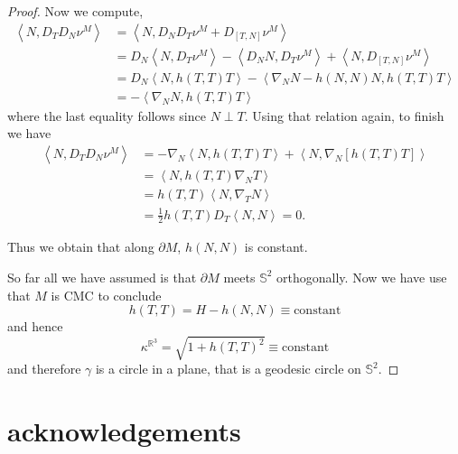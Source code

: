 \documentclass[10pt]{amsart}
\newcommand{\IP}[2]{\left< #1 , #2 \right>}
\newcommand{\R}{\ensuremath{\mathbb{R}}}
\renewcommand{\S}{\ensuremath{\mathbb{S}}}
\theoremstyle{remark}
\begin{document}
\begin{proof}
Now we compute,
\[
\begin{split}
\IP{N}{D_T D_{N} \nu^M} &= \IP{N}{D_{N} D_T \nu^M + D_{[T, N]} \nu^M} \\
&= D_{N} \IP{N}{D_T \nu^M} - \IP{D_{N} N}{D_T \nu^M} + \IP{N}{D_{[T, N]} \nu^M} \\
&= D_{N} \IP{N}{h(T, T) T} - \IP{\nabla_{N} N - h(N, N) N}{h(T, T) T} \\
&= -\IP{\nabla_{N} N}{h(T, T) T} 
\end{split}
\]
where the last equality follows since \(N \perp T\). Using that relation again, to finish we have
\[
\begin{split}
\IP{N}{D_T D_{N} \nu^M} &= -\nabla_{N} \IP{N}{h(T, T) T} + \IP{N}{\nabla_{N} [h(T, T) T]} \\
&= \IP{N}{h(T, T) \nabla_{N} T} \\
&= h(T, T) \IP{N}{\nabla_T N} \\
&= \frac{1}{2} h(T, T) D_T \IP{N}{N} = 0.
\end{split}
\]

Thus we obtain that along \(\partial M\), \(h(N, N)\) is constant.

So far all we have assumed is that \(\partial M\) meets \(\S^2\) orthogonally. Now we have use that \(M\) is CMC to conclude
\[
h(T, T) = H - h(N, N) \equiv \text{constant}
\]
and hence
\[
\kappa^{\R^3} = \sqrt{1 + h(T, T)^2} \equiv \text{constant}
\]
and therefore \(\gamma\) is a circle in a plane, that is a geodesic circle on \(\S^2\).
\end{proof}

\section*{acknowledgements}



\end{document}
